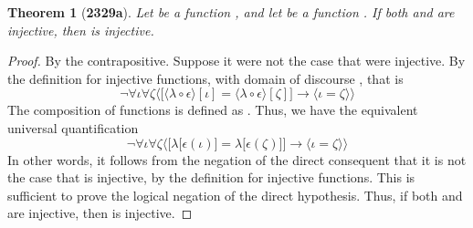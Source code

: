 \documentclass[preview]{standalone}
\newtheorem*{theorem*}{Theorem}
\begin{document}
\begin{theorem*}[\textbf{2329a}]
    Let \bm{$\lambda$} be a function 
    , 
    and let \bm{$\epsilon$} be a function 
    \bm{$\epsilon: \Lambda \rightarrow \Delta$}. 
    If both \bm{$\lambda$} and \bm{$\epsilon$} are injective, 
    then \bm{$\big \langle \lambda \circ \epsilon \big \rangle$} is injective.
\end{theorem*}

\begin{proof}
    By the contrapositive.
    Suppose it were not the case that 
    \bm{$\big \langle \lambda \circ \epsilon \big \rangle$}
    were injective. 
    By the definition for injective functions, 
    with domain of discourse 
    \bm{$\big \langle \iota, \zeta \in \Lambda \big \rangle$}, that is
    \begin{equation*}
        \lnot \forall \iota \forall \zeta \bigg \langle 
            \Big[
                \big \langle \lambda \circ \epsilon \big \rangle [\iota] 
                    = 
                \big \langle \lambda \circ \epsilon \big \rangle [\zeta] 
            \Big]
                \rightarrow 
            \big \langle \iota = \zeta \big \rangle 
        \bigg \rangle
    \end{equation*}
    The composition of functions 
    \bm{$\big \langle \lambda \circ \epsilon \big \rangle [\iota]$} 
    is defined as \bm{$\lambda \big[ \epsilon (\iota) \big]$}. 
    Thus, we have the equivalent universal quantification
    \begin{equation*}
        \lnot \forall \iota \forall \zeta \bigg \langle 
            \Big[
                \lambda \big[ \epsilon (\iota) \big] 
                    = 
                \lambda \big[ \epsilon (\zeta) \big] 
            \Big]
                \rightarrow
            \big \langle \iota = \zeta \big \rangle
        \bigg \rangle
    \end{equation*}
    In other words, it follows from the negation of the direct consequent that 
    it is not the case that \bm{$\lambda$} is injective, 
    by the definition for injective functions. 
    This is sufficient to prove the logical negation of the direct hypothesis. 
    Thus, if both \bm{$\lambda$} and \bm{$\epsilon$} are injective, 
    then 
    \bm{$\big \langle \lambda \circ \epsilon \big \rangle$} 
    is injective.
\color{lightgray} \end{proof}
\end{document}
